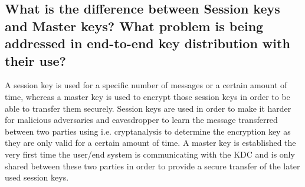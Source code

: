 \documentclass{report}
\begin{document}
		\subsection{What is the difference between Session keys and Master keys? What problem is being addressed in end-to-end key distribution with their use?}
		\startsubsection
			A session key is used for a specific number of messages or a certain amount of time, whereas a master key is used to encrypt those session keys in order to be able to transfer them securely. Session keys are used in order to make it harder for malicious adversaries and eavesdropper to learn the message transferred between two parties using i.e. cryptanalysis to determine the encryption key as they are only valid for a certain amount of time. A master key is established the very first time the user/end system is communicating with the KDC and is only shared between these two parties in order to provide a secure transfer of the later used session keys.
		\closesection
	\closesection
\end{document}

